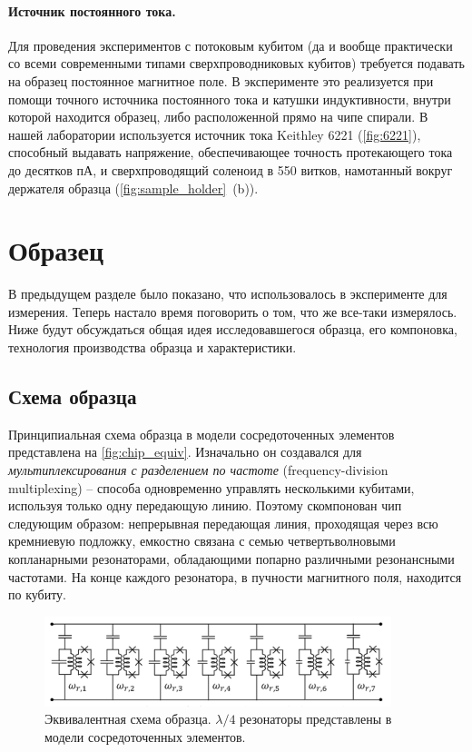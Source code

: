 \documentclass[12pt, twoside]{report}
\numberwithin{equation}{section}
\numberwithin{figure}{section}
\begin{document}
\paragraph{Источник постоянного тока.} Для проведения экспериментов с потоковым кубитом (да и вообще практически со всеми современными типами сверхпроводниковых кубитов) требуется подавать на образец постоянное магнитное поле. В эксперименте это реализуется при помощи точного источника постоянного тока и катушки индуктивности, внутри которой находится образец, либо расположенной прямо на чипе спирали. В нашей лаборатории используется источник тока Keithley 6221 (\autoref{fig:6221}), способный выдавать напряжение, обеспечивающее точность протекающего тока до десятков пА, и сверхпроводящий соленоид в 550 витков, намотанный вокруг держателя образца (\autoref{fig:sample_holder}~(b)).


\section{Образец}

В предыдущем разделе было показано, что использовалось в эксперименте для измерения. Теперь настало время поговорить о том, что же все-таки измерялось. Ниже будут обсуждаться общая идея исследовавшегося образца, его компоновка, технология производства образца и характеристики.

\subsection{Схема образца}

Принципиальная схема образца в модели сосредоточенных элементов представлена на \autoref{fig:chip_equiv}. Изначально он создавался\cite{Jerger2013} для \textit{мультиплексирования с разделением по частоте} (frequency-division multiplexing) -- способа одновременно управлять несколькими кубитами, используя только одну передающую линию. Поэтому скомпонован чип следующим образом: непрерывная передающая линия, проходящая через всю кремниевую подложку, емкостно связана с семью четвертьволновыми копланарными резонаторами, обладающими попарно различными резонансными частотами. На конце каждого резонатора, в пучности магнитного поля, находится по кубиту.

\begin{figure}[h]
\centering
\includegraphics[width=0.9\textwidth]{Pictures/chip_equiv}
\caption{Эквивалентная схема образца\cite{Jerger2013}. $\lambda/4$ резонаторы представлены в модели сосредоточенных элементов.}
\label{fig:chip_equiv}
\end{figure}
\end{document}
